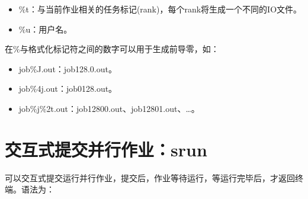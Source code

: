\documentclass[a4paper,12pt,english]{sphinxmanual}
\begin{document}
\begin{itemize}
\begin{itemize}
\item {} 
\sphinxAtStartPar
\%t：与当前作业相关的任务标记(rank)，每个rank将生成一个不同的IO文件。

\item {} 
\sphinxAtStartPar
\%u：用户名。

\end{itemize}

\sphinxAtStartPar
在\%与格式化标记符之间的数字可以用于生成前导零，如：
\begin{itemize}
\item {} 
\sphinxAtStartPar
job\%J.out：job128.0.out。

\item {} 
\sphinxAtStartPar
job\%4j.out：job0128.out。

\item {} 
\sphinxAtStartPar
job\%j\sphinxhyphen{}\%2t.out：job128\sphinxhyphen{}00.out、job128\sphinxhyphen{}01.out、…。

\end{itemize}

\end{itemize}


\section{交互式提交并行作业：srun}
\label{\detokenize{slurm/slurm:srun}}
\sphinxAtStartPar
{}可以交互式提交运行并行作业，提交后，作业等待运行，等运行完毕后，才返回终端。语法为：
\end{document}
